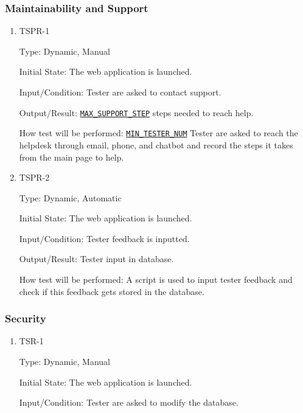 \documentclass[12pt, titlepage]{article}
\begin{document}
\begin{enumerate}
\begin{enumerate}
\end{enumerate}
\subsubsection{Maintainability and Support}

\begin{enumerate}
\item{TSPR-1\\}\label{TSPR-1}

Type: Dynamic, Manual
					
Initial State: The web application is launched.
					
Input/Condition: Tester are asked to contact support.
					
Output/Result: \hyperref[MAX_SUPPORT_STEP]{\texttt{MAX\_SUPPORT\_STEP}} steps needed to reach help.
					
How test will be performed: \hyperref[MIN_TESTER_NUM]{\texttt{MIN\_TESTER\_NUM}} Tester are asked to reach the helpdesk through email, phone, and chatbot and record the steps it takes from the main page to help.


\item{TSPR-2\\}\label{TSPR-2}

Type: Dynamic, Automatic
					
Initial State: The web application is launched.
					
Input/Condition: Tester feedback is inputted.
					
Output/Result: Tester input in database.
					
How test will be performed: A script is used to input tester feedback and check if this feedback gets stored in the database.

\end{enumerate}

\subsubsection{Security}

\begin{enumerate}

\item{TSR-1\\}\label{TSR-3}

Type: Dynamic, Manual
					
Initial State: The web application is launched.
					
Input/Condition: Tester are asked to modify the database.
					

\end{enumerate}
\end{enumerate}
\end{document}
